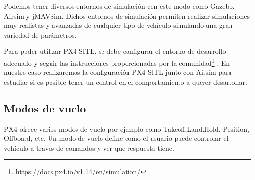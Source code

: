 Podemos tener diversos entornos de simulación con este modo como Gazebo, Airsim y jMAVSim. Dichos entornos de simulación permiten realizar simulaciones muy realistas y avanzadas 
de cualquier tipo de vehículo simulando una gran variedad de parámetros.\newline

Para poder utilizar PX4 SITL, se debe configurar el entorno de desarrollo adecuado y seguir las instrucciones proporcionadas por la comunidad\footnote{\url{https://docs.px4.io/v1.14/en/simulation/}} .
En nuestro caso realizaremos la configuración PX4 SITL junto con Airsim para estudiar si es posible tener un control en el comportamiento a querer
desarrollar. 

\subsection{Modos de vuelo}
\label{sec:flight modes} 

PX4 ofrece varios modos de vuelo por ejemplo como Takeoff,Land,Hold, Position, Offboard, etc. Un modo de vuelo define como el usuario puede controlar el vehículo a traves de comandos
  y ver que respuesta tiene. 


